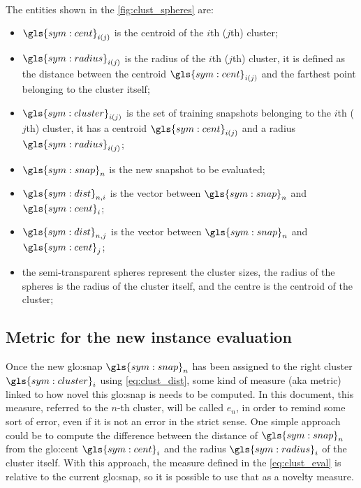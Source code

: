 \paragraph*{}
The entities shown in the \autoref{fig:clust_spheres} are:
\begin{itemize}
  \item $\gls{sym:cent}_{i(j)}$ is the centroid of the $i$th ($j$th) cluster;
  \item $\gls{sym:radius}_{i(j)}$ is the radius of the $i$th ($j$th) cluster, it is defined as the distance between the centroid $\gls{sym:cent}_{i(j)}$ and the farthest point belonging to the cluster itself;
  \item $\gls{sym:cluster}_{i(j)}$ is the set of training snapshots belonging to the $i$th ($j$th) cluster, it has a centroid $\gls{sym:cent}_{i(j)}$ and a radius $\gls{sym:radius}_{i(j)}$;
  \item $\gls{sym:snap}_n$ is the new snapshot to be evaluated;
  \item $\gls{sym:dist}_{n,i}$ is the vector between $\gls{sym:snap}_n$ and $\gls{sym:cent}_i$;
  \item $\gls{sym:dist}_{n,j}$ is the vector between $\gls{sym:snap}_n$ and $\gls{sym:cent}_j$;
  \item the semi-transparent spheres represent the cluster sizes, the radius of the spheres is the radius of the cluster itself, and the centre is the centroid of the cluster;
\end{itemize}



\subsection{Metric for the new instance evaluation}
\label{sec:clust_metric}
Once the new {\gls{glo:snap}} $\gls{sym:snap}_n$ has been assigned to the right cluster $\gls{sym:cluster}_i$ using \autoref{eq:clust_dist}, some kind of measure (\gls{aka} metric) linked to how novel this {\gls{glo:snap}} is needs to be computed. In this document, this measure, referred to the $n$-th cluster, will be called $e_n$, in order to remind some sort of error, even if it is not an error in the strict sense. One simple approach could be to compute the difference between the distance of $\gls{sym:snap}_n$ from the {\gls{glo:cent}} $\gls{sym:cent}_i$ and the radius $\gls{sym:radius}_i$ of the cluster itself. With this approach, the measure defined in the \autoref{eq:clust_eval} is relative to the current {\gls{glo:snap}}, so it is possible to use that as a novelty measure.

